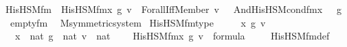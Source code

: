 \begin{isabellebody}
\ His{\isacharunderscore}{\kern0pt}HS{\isacharunderscore}{\kern0pt}M{\isacharunderscore}{\kern0pt}fm\ \ {\isachardoublequoteopen}His{\isacharunderscore}{\kern0pt}HS{\isacharunderscore}{\kern0pt}M{\isacharunderscore}{\kern0pt}fm{\isacharparenleft}{\kern0pt}x{\isacharprime}{\kern0pt}{\isacharcomma}{\kern0pt}\ g{\isacharcomma}{\kern0pt}\ v{\isacharparenright}{\kern0pt}\ {\isasymequiv}\ Forall{\isacharparenleft}{\kern0pt}Iff{\isacharparenleft}{\kern0pt}Member{\isacharparenleft}{\kern0pt}{}{\isacharcomma}{\kern0pt}\ v\ {\isacharhash}{\kern0pt}{\isacharplus}{\kern0pt}\ {}{\isacharparenright}{\kern0pt}{\isacharcomma}{\kern0pt}\ And{\isacharparenleft}{\kern0pt}His{\isacharunderscore}{\kern0pt}HS{\isacharunderscore}{\kern0pt}M{\isacharunderscore}{\kern0pt}cond{\isacharunderscore}{\kern0pt}fm{\isacharprime}{\kern0pt}{\isacharparenleft}{\kern0pt}x{\isacharprime}{\kern0pt}\ {\isacharhash}{\kern0pt}{\isacharplus}{\kern0pt}\ {}{\isacharcomma}{\kern0pt}\ g\ {\isacharhash}{\kern0pt}{\isacharplus}{\kern0pt}\ {}{\isacharparenright}{\kern0pt}{\isacharcomma}{\kern0pt}\ empty{\isacharunderscore}{\kern0pt}fm{\isacharparenleft}{\kern0pt}{}{\isacharparenright}{\kern0pt}{\isacharparenright}{\kern0pt}{\isacharparenright}{\kern0pt}{\isacharparenright}{\kern0pt}{\isachardoublequoteclose}\ \isanewline
\isanewline
{}\isamarkupfalse%
\ M{\isacharunderscore}{\kern0pt}symmetric{\isacharunderscore}{\kern0pt}system\isanewline
{}\isanewline
\isanewline
{}\isamarkupfalse%
\ His{\isacharunderscore}{\kern0pt}HS{\isacharunderscore}{\kern0pt}M{\isacharunderscore}{\kern0pt}fm{\isacharunderscore}{\kern0pt}type\ {\isacharcolon}{\kern0pt}\ \isanewline
\ \ \ x{\isacharprime}{\kern0pt}\ g\ v\ \isanewline
\ \ \ {\isachardoublequoteopen}x{\isacharprime}{\kern0pt}\ {\isasymin}\ nat{\isachardoublequoteclose}\ {\isachardoublequoteopen}g\ {\isasymin}\ nat{\isachardoublequoteclose}\ {\isachardoublequoteopen}v\ {\isasymin}\ nat{\isachardoublequoteclose}\ \isanewline
\ \ \ {\isachardoublequoteopen}His{\isacharunderscore}{\kern0pt}HS{\isacharunderscore}{\kern0pt}M{\isacharunderscore}{\kern0pt}fm{\isacharparenleft}{\kern0pt}x{\isacharprime}{\kern0pt}{\isacharcomma}{\kern0pt}\ g{\isacharcomma}{\kern0pt}\ v{\isacharparenright}{\kern0pt}\ {\isasymin}\ formula{\isachardoublequoteclose}\ \isanewline
%
\isadelimproof
\ \ %
\endisadelimproof
%
\isatagproof
{}\isamarkupfalse%
\ His{\isacharunderscore}{\kern0pt}HS{\isacharunderscore}{\kern0pt}M{\isacharunderscore}{\kern0pt}fm{\isacharunderscore}{\kern0pt}def\ \isanewline

\end{isabellebody}
